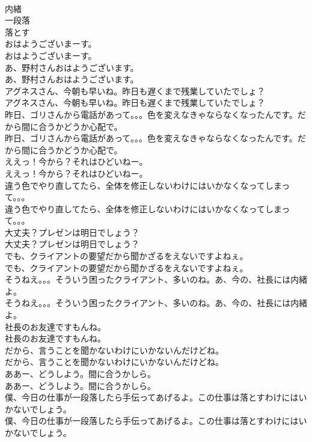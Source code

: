 \documentclass[8pt]{extreport}
\begin{document}
\begin{CJK}{UTF8}{min}
\\	内緒
\\	一段落
\\	落とす
\\	おはようございまーす。	
\\	おはようございまーす。 
\\	あ、野村さんおはようございます。	
\\	あ、野村さんおはようございます。 
\\	アグネスさん、今朝も早いね。昨日も遅くまで残業していたでしょ？	
\\	アグネスさん、今朝も早いね。昨日も遅くまで残業していたでしょ？ 
\\	昨日、ゴリさんから電話があって。。。色を変えなきゃならなくなったんです。だから間に合うかどうか心配で。	
\\	昨日、ゴリさんから電話があって。。。色を変えなきゃならなくなったんです。だから間に合うかどうか心配で。 
\\	ええっ！今から？それはひどいねー。	
\\	ええっ！今から？それはひどいねー。 
\\	違う色でやり直してたら、全体を修正しないわけにはいかなくなってしまって。。。	
\\	違う色でやり直してたら、全体を修正しないわけにはいかなくなってしまって。。。 
\\	大丈夫？プレゼンは明日でしょう？	
\\	大丈夫？プレゼンは明日でしょう？ 
\\	でも、クライアントの要望だから聞かざるをえないですよねぇ。	
\\	でも、クライアントの要望だから聞かざるをえないですよねぇ。 
\\	そうねえ。。。そういう困ったクライアント、多いのね。あ、今の、社長には内緒よ。	
\\	そうねえ。。。そういう困ったクライアント、多いのね。あ、今の、社長には内緒よ。 
\\	社長のお友達ですもんね。	
\\	社長のお友達ですもんね。 
\\	だから、言うことを聞かないわけにいかないんだけどね。	
\\	だから、言うことを聞かないわけにいかないんだけどね。 
\\	ああー、どうしよう。間に合うかしら。	
\\	ああー、どうしよう。間に合うかしら。 
\\	僕、今日の仕事が一段落したら手伝ってあげるよ。この仕事は落とすわけにはいかないでしょう。	
\\	僕、今日の仕事が一段落したら手伝ってあげるよ。この仕事は落とすわけにはいかないでしょう。 

\end{CJK}
\end{document}
